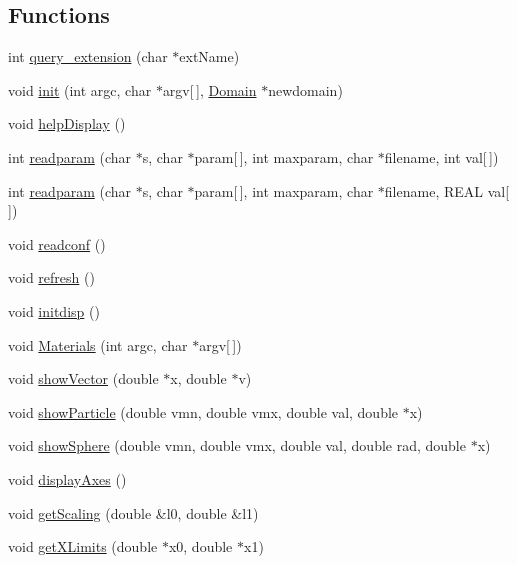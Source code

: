 \subsection*{Functions}
\begin{CompactItemize}
\item 
int \hyperlink{namespaceGui_7fbca852fb0cacc6663ba5689441c628}{query\_\-extension} (char $\ast$extName)
\item 
void \hyperlink{namespaceGui_c7a8f5580648139e0b12062692cdf4d5}{init} (int argc, char $\ast$argv\mbox{[}$\,$\mbox{]}, \hyperlink{classDomain}{Domain} $\ast$newdomain)
\item 
void \hyperlink{namespaceGui_0e5d9f6cb4fd8f9ddb9f214e12b4e6e5}{helpDisplay} ()
\item 
int \hyperlink{namespaceGui_c367306deffcdaf711e6dfe0452b0b76}{readparam} (char $\ast$s, char $\ast$param\mbox{[}$\,$\mbox{]}, int maxparam, char $\ast$filename, int val\mbox{[}$\,$\mbox{]})
\item 
int \hyperlink{namespaceGui_2dfb340ad9e98cedbf5e4ef8022da1b9}{readparam} (char $\ast$s, char $\ast$param\mbox{[}$\,$\mbox{]}, int maxparam, char $\ast$filename, REAL val\mbox{[}$\,$\mbox{]})
\item 
void \hyperlink{namespaceGui_adc1ae9662345d502dd4bccf0ea58473}{readconf} ()
\item 
void \hyperlink{namespaceGui_5b94ce6e857635065a0c2053b95529b5}{refresh} ()
\item 
void \hyperlink{namespaceGui_6d4b87c2b4664134825955c4ff89f2df}{initdisp} ()
\item 
void \hyperlink{namespaceGui_14bb49f023f388f7b0ff25c7a9b963e2}{Materials} (int argc, char $\ast$argv\mbox{[}$\,$\mbox{]})
\item 
void \hyperlink{namespaceGui_f8cee9625f9a733c48a9dce46829368a}{showVector} (double $\ast$x, double $\ast$v)
\item 
void \hyperlink{namespaceGui_ffad4636da327fdb77959a672413695a}{showParticle} (double vmn, double vmx, double val, double $\ast$x)
\item 
void \hyperlink{namespaceGui_5c3ecb8dde5ba2aea7ef1d89ef30f66a}{showSphere} (double vmn, double vmx, double val, double rad, double $\ast$x)
\item 
void \hyperlink{namespaceGui_2e3009086a3b9c82c98613657675c89a}{displayAxes} ()
\item 
void \hyperlink{namespaceGui_e7d03455e3e501e3e58965a138c3aa6c}{getScaling} (double \&l0, double \&l1)
\item 
void \hyperlink{namespaceGui_ea3e30468c8a97723f3a69e8810b4b38}{getXLimits} (double $\ast$x0, double $\ast$x1)

\end{CompactItemize}
